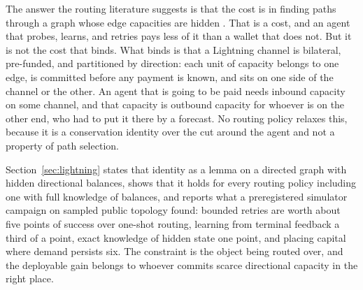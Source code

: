 \documentclass[11pt]{article}
\theoremstyle{plain}
\theoremstyle{definition}
\theoremstyle{remark}
\begin{document}
The answer the routing literature suggests is that the cost is in finding paths through a graph whose edge capacities are hidden \citep{pickhardt2021optimally,tikhomirov2020probing}. That is a cost, and an agent that probes, learns, and retries pays less of it than a wallet that does not. But it is not the cost that binds. What binds is that a Lightning channel is bilateral, pre-funded, and partitioned by direction: each unit of capacity belongs to one edge, is committed before any payment is known, and sits on one side of the channel or the other. An agent that is going to be paid needs inbound capacity on some channel, and that capacity is outbound capacity for whoever is on the other end, who had to put it there by a forecast. No routing policy relaxes this, because it is a conservation identity over the cut around the agent and not a property of path selection.

Section~\ref{sec:lightning} states that identity as a lemma on a directed graph with hidden directional balances, shows that it holds for every routing policy including one with full knowledge of balances, and reports what a preregistered simulator campaign on sampled public topology found: bounded retries are worth about five points of success over one-shot routing, learning from terminal feedback a third of a point, exact knowledge of hidden state one point, and placing capital where demand persists six. The constraint is the object being routed over, and the deployable gain belongs to whoever commits scarce directional capacity in the right place.
\end{document}
